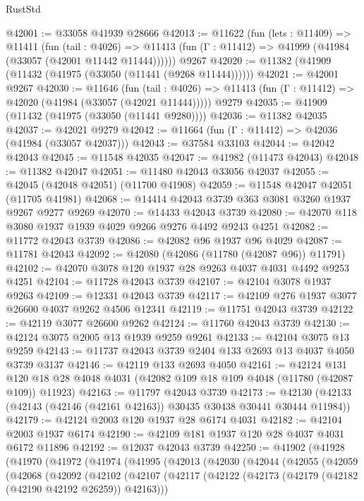 \begin{lexlean}{RustStd}
\begin{coremodule}
@42001 := @33058 @41939 @28666
@42013 := @11622
    (fun (lets : @11409) =>
    @11411
      (fun (tail : @4026) =>
      @11413 (fun (Γ : @11412) => @41999 (@41984 (@33057 (@42001 @11442 @11444))))))
    @9267
@42020 := @11382 (@41909 (@11432 (@41975 (@33050 (@11441 (@9268 @11444))))))
@42021 := @42001 @9267
@42030 := @11646
    (fun (tail : @4026) => @11413 (fun (Γ : @11412) => @42020 (@41984 (@33057 (@42021 @11444)))))
    @9279
@42035 := @41909 (@11432 (@41975 (@33050 (@11441 @9280))))
@42036 := @11382 @42035
@42037 := @42021 @9279
@42042 := @11664 (fun (Γ : @11412) => @42036 (@41984 (@33057 @42037)))
@42043 := @37584 @33103
@42044 := @42042 @42043
@42045 := @11548 @42035
@42047 := @41982 (@11473 @42043)
@42048 := @11382 @42047
@42051 := @11480 @42043 @33056 @42037
@42055 := @42045 (@42048 @42051) (@11700 @41908)
@42059 := @11548 @42047 @42051 (@11705 @41981)
@42068 := @14414 @42043 @3739 @363 @3081 @3260 @1937 @9267 @9277 @9269
@42070 := @14433 @42043 @3739
@42080 := @42070 @118 @3080 @1937 @1939 @4029 @9266 @9276 @4492 @9243 @4251
@42082 := @11772 @42043 @3739
@42086 := @42082 @96 @1937 @96 @4029
@42087 := @11781 @42043
@42092 := @42080 (@42086 (@11780 (@42087 @96)) @11791)
@42102 := @42070 @3078 @120 @1937 @28 @9263 @4037 @4031 @4492 @9253 @4251
@42104 := @11728 @42043 @3739
@42107 := @42104 @3078 @1937 @9263
@42109 := @12331 @42043 @3739
@42117 := @42109 @276 @1937 @3077 @26600 @4037 @9262 @4506 @12341
@42119 := @11751 @42043 @3739
@42122 := @42119 @3077 @26600 @9262
@42124 := @11760 @42043 @3739
@42130 := @42124 @3075 @2005 @13 @1939 @9259 @9261
@42133 := @42104 @3075 @13 @9259
@42143 := @11737 @42043 @3739 @2404 @133 @2693 @13 @4037 @4050 @3739 @3137
@42146 := @42119 @133 @2693 @4050
@42161 := @42124
    @131
    @120
    @18
    @28
    @4048
    @4031
    (@42082 @109 @18 @109 @4048 (@11780 (@42087 @109)) @11923)
@42163 := @11797 @42043 @3739
@42173 := @42130 (@42133 (@42143 (@42146 (@42161 @42163)) @30435 @30438 @30441 @30444 @11984))
@42179 := @42124 @2003 @120 @1937 @28 @6174 @4031
@42182 := @42104 @2003 @1937 @6174
@42190 := @42109 @181 @1937 @120 @28 @4037 @4031 @6172 @11896
@42192 := @12037 @42043 @3739
@42250 := @41902
    (@41928
      (@41970
        (@41972
          (@41974
            (@41995
              (@42013
                (@42030
                  (@42044
                    (@42055
                      (@42059
                        (@42068
                          (@42092
                            (@42102
                              (@42107
                                (@42117
                                  (@42122 (@42173 (@42179 (@42182 (@42190 @42192 @26259)) @42163)))

\end{coremodule}
\end{lexlean}
